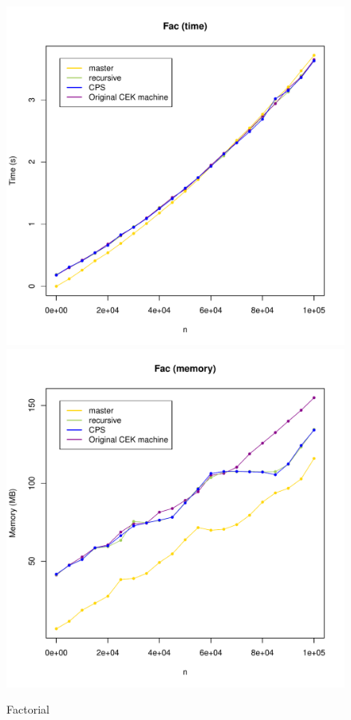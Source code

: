 \documentclass[a4paper]{article}
\begin{document}
\begin{figure}[H]
\centering
\includegraphics[width=0.8\linewidth]{fac-times.pdf}
\includegraphics[width=0.8\linewidth]{fac-mem.pdf}
\caption{Factorial}\label{fig:fac-graphs}
\end{figure}
\end{document}
